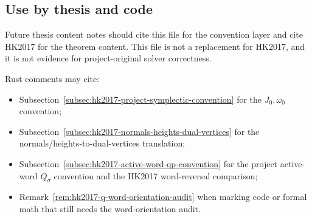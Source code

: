 \subsection{Use by thesis and code}
\label{subsec:hk2017-conventions-use-by-thesis-and-code}

Future thesis content notes should cite this file for the convention layer and
cite HK2017 for the theorem content.  This file is not a replacement for
HK2017, and it is not evidence for project-original solver correctness.

Rust comments may cite:
\begin{itemize}
  \item Subsection~\ref{subsec:hk2017-project-symplectic-convention} for the
    \(J_0,\omega_0\) convention;
  \item Subsection~\ref{subsec:hk2017-normals-heights-dual-vertices} for the
    normals/heights-to-dual-vertices translation;
  \item Subsection~\ref{subsec:hk2017-active-word-qp-convention} for the
    project active-word \(Q_\sigma\) convention and the HK2017 word-reversal
    comparison;
  \item Remark~\ref{rem:hk2017-q-word-orientation-audit} when marking code or
    formal math that still needs the word-orientation audit.
\end{itemize}
